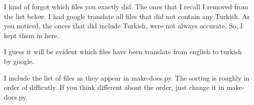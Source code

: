 \documentclass[12pt]{article}
\newcommand{\nvf}[1]{{\leavevmode\color{red}#1}\marginnote{\dbend}}
\begin{document}
\nvf{I kind of forgot which files you exactly did. The ones that I recall I removed from the list below. I had google translate all files that did not contain any Turkish. As you noticed, the onces that did include Turkish, were not always accurate. So, I kept them in here. 

I guess it will be evident which files have been translate from english to turkish by google. 

I include the list of files as they appear in make-docs.py. The sorting is roughly in order of difficutly. If you think different about the order, just change it in make-docs.py.
}
\end{document}
